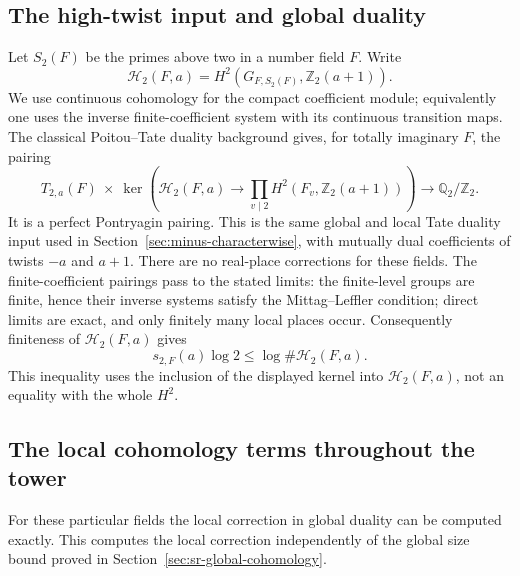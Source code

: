 \subsection{The high-twist input and global duality}
Let \(S_2(F)\) be the primes above two in a number field \(F\).
Write
\[
 \mathcal H_2(F,a)=
 H^2(G_{F,S_2(F)},\mathbb Z_2(a+1)).
\]
We use continuous cohomology for the compact coefficient module;
equivalently one uses the inverse finite-coefficient system with
its continuous transition maps.
The classical Poitou--Tate duality background gives, for totally
imaginary \(F\), the pairing
\[
 T_{2,a}(F)\ \times\
 \ker\left(\mathcal H_2(F,a)\longrightarrow
       \prod_{v\mid2}H^2(F_v,\mathbb Z_2(a+1))\right)
                      \longrightarrow\mathbb Q_2/\mathbb Z_2 .
\]
It is a perfect Pontryagin pairing.
This is the same global and local Tate duality input used in
Section~\ref{sec:minus-characterwise}, with mutually dual
coefficients of twists \(-a\) and \(a+1\).
There are no real-place corrections for these fields.
The finite-coefficient pairings pass to the stated limits:
the finite-level groups are finite, hence their inverse systems
satisfy the Mittag--Leffler condition; direct limits are exact,
and only finitely many local places occur.
Consequently finiteness of \(\mathcal H_2(F,a)\) gives
\begin{equation}\label{eq:sr-Sha-H2}
 s_{2,F}(a)\log2\leq\log\#\mathcal H_2(F,a).
\end{equation}
This inequality uses the inclusion of the displayed kernel into
\(\mathcal H_2(F,a)\), not an equality with the whole \(H^2\).

\subsection{The local cohomology terms throughout the tower}
For these particular fields the local correction in global duality can
be computed exactly. This computes the local correction independently of the global size
bound proved in Section~\ref{sec:sr-global-cohomology}.

